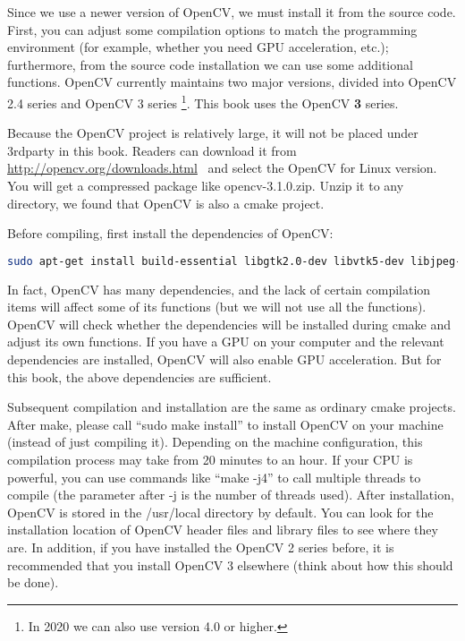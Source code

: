 Since we use a newer version of OpenCV, we must install it from the source code. First, you can adjust some compilation options to match the programming environment (for example, whether you need GPU acceleration, etc.); furthermore, from the source code installation we can use some additional functions. OpenCV currently maintains two major versions, divided into OpenCV 2.4 series and OpenCV 3 series \footnote{In 2020 we can also use version 4.0 or higher.}. This book uses the OpenCV \textbf {3} series.

Because the OpenCV project is relatively large, it will not be placed under 3rdparty in this book. Readers can download it from ~ \url{http://opencv.org/downloads.html}~ and select the OpenCV for Linux version. You will get a compressed package like opencv-3.1.0.zip. Unzip it to any directory, we found that OpenCV is also a cmake project.

Before compiling, first install the dependencies of OpenCV:
\begin{lstlisting}[language=sh, caption=Terminal input:]
sudo apt-get install build-essential libgtk2.0-dev libvtk5-dev libjpeg-dev libtiff4-dev libjasper-dev libopenexr-dev libtbb-dev
\end{lstlisting}

In fact, OpenCV has many dependencies, and the lack of certain compilation items will affect some of its functions (but we will not use all the functions). OpenCV will check whether the dependencies will be installed during cmake and adjust its own functions. If you have a GPU on your computer and the relevant dependencies are installed, OpenCV will also enable GPU acceleration. But for this book, the above dependencies are sufficient.

Subsequent compilation and installation are the same as ordinary cmake projects. After make, please call ``sudo make install'' to install OpenCV on your machine (instead of just compiling it). Depending on the machine configuration, this compilation process may take from 20 minutes to an hour. If your CPU is powerful, you can use commands like ``make -j4'' to call multiple threads to compile (the parameter after -j is the number of threads used). After installation, OpenCV is stored in the /usr/local directory by default. You can look for the installation location of OpenCV header files and library files to see where they are. In addition, if you have installed the OpenCV 2 series before, it is recommended that you install OpenCV 3 elsewhere (think about how this should be done).

